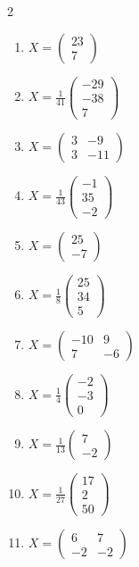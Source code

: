 \begin{multicols}{2}
\begin{enumerate}[label=\arabic*., leftmargin=*, itemsep=1pt]
\item $X=\left(\begin{smallmatrix}23\\ 7\end{smallmatrix}\right)$
\item $X=\frac{1}{41}\left(\begin{smallmatrix}-29\\ -38\\ 7\end{smallmatrix}\right)$
\item $X=\left(\begin{smallmatrix}3 & -9\\ 3 & -11\end{smallmatrix}\right)$
\item $X=\frac{1}{43}\left(\begin{smallmatrix}-1\\ 35\\ -2\end{smallmatrix}\right)$
\item $X=\left(\begin{smallmatrix}25\\ -7\end{smallmatrix}\right)$
\item $X=\frac{1}{8}\left(\begin{smallmatrix}25\\ 34\\ 5\end{smallmatrix}\right)$
\item $X=\left(\begin{smallmatrix}-10 & 9\\ 7 & -6\end{smallmatrix}\right)$
\item $X=\frac{1}{4}\left(\begin{smallmatrix}-2\\ -3\\ 0\end{smallmatrix}\right)$
\item $X=\frac{1}{13}\left(\begin{smallmatrix}7\\ -2\end{smallmatrix}\right)$
\item $X=\frac{1}{27}\left(\begin{smallmatrix}17\\ 2\\ 50\end{smallmatrix}\right)$
\item $X=\left(\begin{smallmatrix}6 & 7\\ -2 & -2\end{smallmatrix}\right)$

\end{enumerate}
\end{multicols}
